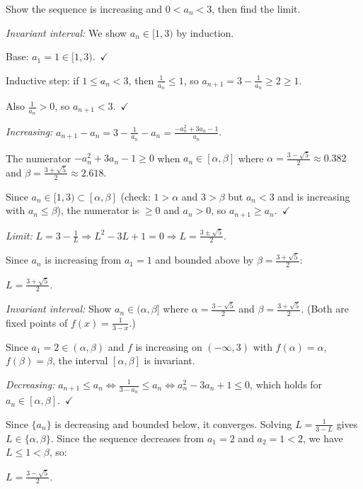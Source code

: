 \begin{examplebox}[title={Worked Example (Tutorial 8, Question 2): $a_1=1$, $a_{n+1}=3-\frac{1}{a_n}$}]

Show the sequence is increasing and $0<a_n<3$, then find the limit.

\emph{Invariant interval:} We show $a_n\in[1,3)$ by induction.

Base: $a_1=1\in[1,3)$.\ $\checkmark$

Inductive step: if $1\le a_n<3$, then $\frac{1}{a_n}\le 1$, so $a_{n+1}=3-\frac{1}{a_n}\ge 2\ge 1$.

Also $\frac{1}{a_n}>0$, so $a_{n+1}<3$.\ $\checkmark$

\emph{Increasing:} $a_{n+1}-a_n=3-\frac{1}{a_n}-a_n=\frac{-a_n^2+3a_n-1}{a_n}$.

The numerator $-a_n^2+3a_n-1\ge 0$ when $a_n\in[\alpha,\beta]$ where $\alpha=\frac{3-\sqrt{5}}{2}\approx 0.382$ and $\beta=\frac{3+\sqrt{5}}{2}\approx 2.618$.

Since $a_n\in[1,3)\subset[\alpha,\beta]$ (check: $1>\alpha$ and $3>\beta$ but $a_n<3$ and is increasing with $a_n\le\beta$), the numerator is $\ge 0$ and $a_n>0$, so $a_{n+1}\ge a_n$.\ $\checkmark$

\emph{Limit:} $L=3-\frac{1}{L}\Rightarrow L^2-3L+1=0\Rightarrow L=\frac{3\pm\sqrt{5}}{2}$.

Since $a_n$ is increasing from $a_1=1$ and bounded above by $\beta=\frac{3+\sqrt{5}}{2}$:

$\boxed{L=\frac{3+\sqrt{5}}{2}}$.

\end{examplebox}

\begin{examplebox}[title={Worked Example (Tutorial 8, Question 3): $a_1=2$, $a_{n+1}=\frac{1}{3-a_n}$}]

\emph{Invariant interval:} Show $a_n\in(\alpha,\beta]$ where $\alpha=\frac{3-\sqrt{5}}{2}$ and $\beta=\frac{3+\sqrt{5}}{2}$. (Both are fixed points of $f(x)=\frac{1}{3-x}$.)

Since $a_1=2\in(\alpha,\beta)$ and $f$ is increasing on $(-\infty,3)$ with $f(\alpha)=\alpha$, $f(\beta)=\beta$, the interval $[\alpha,\beta]$ is invariant.

\emph{Decreasing:} $a_{n+1}\le a_n\iff \frac{1}{3-a_n}\le a_n\iff a_n^2-3a_n+1\le 0$, which holds for $a_n\in[\alpha,\beta]$.\ $\checkmark$

Since $\{a_n\}$ is decreasing and bounded below, it converges. Solving $L=\frac{1}{3-L}$ gives $L\in\{\alpha,\beta\}$. Since the sequence decreases from $a_1=2$ and $a_2=1<2$, we have $L\le 1<\beta$, so:

$\boxed{L=\frac{3-\sqrt{5}}{2}}$.

\end{examplebox}

